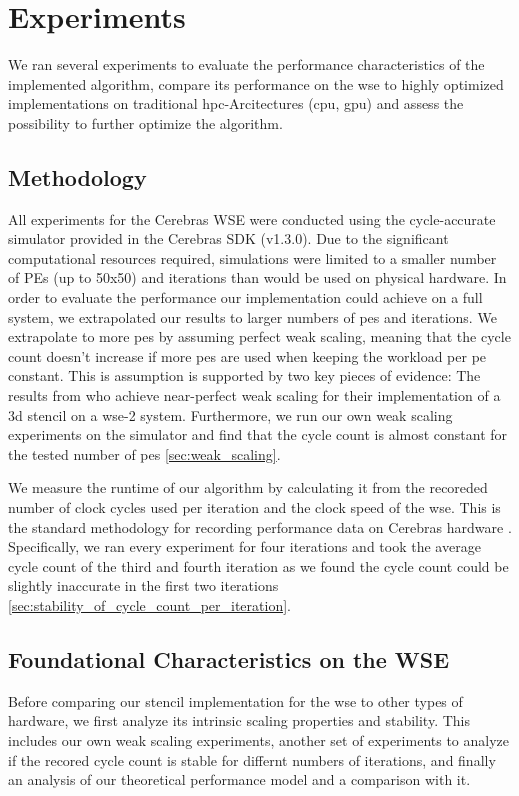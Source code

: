 \chapter{Experiments}
\label{sec:experiments}
We ran several experiments to evaluate the performance characteristics of the implemented algorithm, compare its performance on the \ac{wse} to highly optimized implementations on traditional \ac{hpc}-Arcitectures (\ac{cpu}, \ac{gpu}) and assess the possibility to further optimize the algorithm.

\section{Methodology}
All experiments for the Cerebras WSE were conducted using the cycle-accurate simulator provided in the Cerebras SDK (v1.3.0).
Due to the significant computational resources required, simulations were limited to a smaller number of PEs (up to 50x50) and iterations than would be used on physical hardware.
In order to evaluate the performance our implementation could achieve on a full system, we extrapolated our results to larger numbers of \acp{pe} and iterations.
We extrapolate to more \acp{pe} by assuming perfect weak scaling, meaning that the cycle count doesn't increase if more \acp{pe} are used when keeping the workload per \ac{pe} constant.
This is assumption is supported by two key pieces of evidence: The results from \textcite{jacquelin2022scalable}\cite{jacquelin2022scalable} who achieve near-perfect weak scaling for their implementation of a 3d stencil on a \ac{wse}-2 system.
Furthermore, we run our own weak scaling experiments on the simulator and find that the cycle count is almost constant for the tested number of \acp{pe} \autoref{sec:weak_scaling}.

We measure the runtime of our algorithm by calculating it from the recoreded number of clock cycles used per iteration and the clock speed of the \ac{wse}. This is the standard methodology for recording performance data on Cerebras hardware \cite{jacquelin2022scalable}.
Specifically, we ran every experiment for four iterations and took the average cycle count of the third and fourth iteration as we found the cycle count could be slightly inaccurate in the first two iterations \autoref{sec:stability_of_cycle_count_per_iteration}.

\section{Foundational Characteristics on the WSE}
Before comparing our stencil implementation for the \ac{wse} to other types of hardware, we first analyze its intrinsic scaling properties and stability.
This includes our own weak scaling experiments, another set of experiments to analyze if the recored cycle count is stable for differnt numbers of iterations, and finally an analysis of our theoretical performance model and a comparison with it. 

